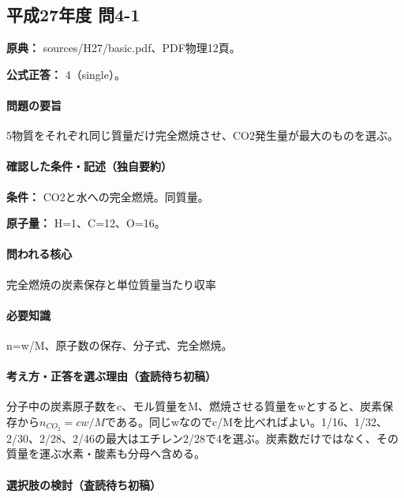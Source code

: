 \subsection{平成27年度 問4-1}
\label{q:h27-reg-basic-4-1}

\noindent\textbf{原典：} sources/H27/basic.pdf、PDF物理12頁。

\textbf{公式正答：} 4（single）。

\paragraph{問題の要旨} 5物質をそれぞれ同じ質量だけ完全燃焼させ、CO2発生量が最大のものを選ぶ。

\paragraph{確認した条件・記述（独自要約）}\mbox{}\par

\noindent\textbf{条件：} CO2と水への完全燃焼。同質量。\par

\noindent\textbf{原子量：} H=\allowbreak{}1、C=\allowbreak{}12、O=\allowbreak{}16。\par

\paragraph{問われる核心} 完全燃焼の炭素保存と単位質量当たり収率

\paragraph{必要知識} n=\allowbreak{}w/M、原子数の保存、分子式、完全燃焼。

\paragraph{考え方・正答を選ぶ理由（査読待ち初稿）} 分子中の炭素原子数をc、モル質量をM、燃焼させる質量をwとすると、炭素保存から\(n_{CO_2}=c w/M\)である。同じwなのでc/Mを比べればよい。1/16、1/32、2/30、2/28、2/46の最大はエチレン2/28で4を選ぶ。炭素数だけではなく、その質量を運ぶ水素・酸素も分母へ含める。

\paragraph{選択肢の検討（査読待ち初稿）}\mbox{}\par

